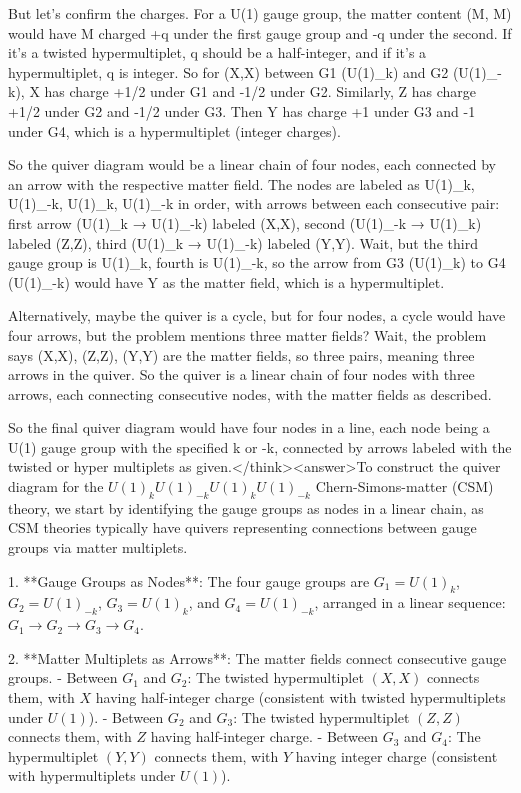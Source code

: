 But let's confirm the charges. For a U(1) gauge group, the matter content (M, M) would have M charged +q under the first gauge group and -q under the second. If it's a twisted hypermultiplet, q should be a half-integer, and if it's a hypermultiplet, q is integer. So for (X,X) between G1 (U(1)_k) and G2 (U(1)_-k), X has charge +1/2 under G1 and -1/2 under G2. Similarly, Z has charge +1/2 under G2 and -1/2 under G3. Then Y has charge +1 under G3 and -1 under G4, which is a hypermultiplet (integer charges). 

So the quiver diagram would be a linear chain of four nodes, each connected by an arrow with the respective matter field. The nodes are labeled as U(1)_k, U(1)_-k, U(1)_k, U(1)_-k in order, with arrows between each consecutive pair: first arrow (U(1)_k → U(1)_-k) labeled (X,X), second (U(1)_-k → U(1)_k) labeled (Z,Z), third (U(1)_k → U(1)_-k) labeled (Y,Y). Wait, but the third gauge group is U(1)_k, fourth is U(1)_-k, so the arrow from G3 (U(1)_k) to G4 (U(1)_-k) would have Y as the matter field, which is a hypermultiplet. 

Alternatively, maybe the quiver is a cycle, but for four nodes, a cycle would have four arrows, but the problem mentions three matter fields? Wait, the problem says (X,X), (Z,Z), (Y,Y) are the matter fields, so three pairs, meaning three arrows in the quiver. So the quiver is a linear chain of four nodes with three arrows, each connecting consecutive nodes, with the matter fields as described. 

So the final quiver diagram would have four nodes in a line, each node being a U(1) gauge group with the specified k or -k, connected by arrows labeled with the twisted or hyper multiplets as given.</think><answer>To construct the quiver diagram for the \( U(1)_k U(1)_{-k} U(1)_k U(1)_{-k} \) Chern-Simons-matter (CSM) theory, we start by identifying the gauge groups as nodes in a linear chain, as CSM theories typically have quivers representing connections between gauge groups via matter multiplets.  

1. **Gauge Groups as Nodes**: The four gauge groups are \( G_1 = U(1)_k \), \( G_2 = U(1)_{-k} \), \( G_3 = U(1)_k \), and \( G_4 = U(1)_{-k} \), arranged in a linear sequence: \( G_1 \to G_2 \to G_3 \to G_4 \).  

2. **Matter Multiplets as Arrows**: The matter fields connect consecutive gauge groups.  
   - Between \( G_1 \) and \( G_2 \): The twisted hypermultiplet \( (X, X) \) connects them, with \( X \) having half-integer charge (consistent with twisted hypermultiplets under \( U(1) \)).  
   - Between \( G_2 \) and \( G_3 \): The twisted hypermultiplet \( (Z, Z) \) connects them, with \( Z \) having half-integer charge.  
   - Between \( G_3 \) and \( G_4 \): The hypermultiplet \( (Y, Y) \) connects them, with \( Y \) having integer charge (consistent with hypermultiplets under \( U(1) \)).  

